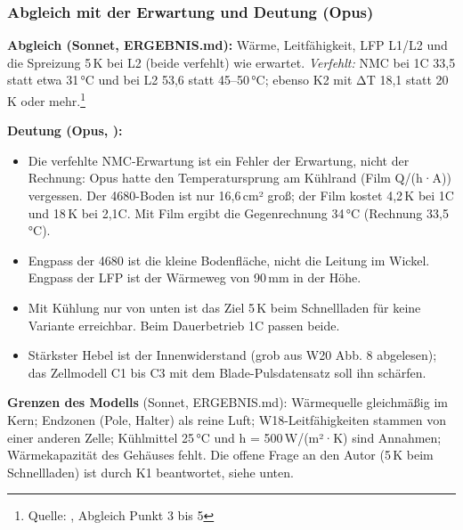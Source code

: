 \documentclass[10pt,a4paper]{article}
\newcommand{\quelle}[1]{\footnote{\raggedright Quelle: #1}}
\begin{document}
\subsubsection*{Abgleich mit der Erwartung und Deutung (Opus)}
\textbf{Abgleich (Sonnet, ERGEBNIS.md):} Wärme, Leitfähigkeit, LFP L1/L2 und die Spreizung 5\,K bei L2 (beide verfehlt) wie erwartet. \emph{Verfehlt:} NMC bei 1C 33,5 statt etwa 31\,°C und bei L2 53,6 statt 45--50\,°C; ebenso K2 mit ΔT 18,1 statt 20\,K oder mehr.\quelle{, Abgleich Punkt 3 bis 5}

\textbf{Deutung (Opus, ):}
\begin{itemize}[nosep]
\item Die verfehlte NMC-Erwartung ist ein Fehler der Erwartung, nicht der Rechnung: Opus hatte den Temperatursprung am Kühlrand (Film Q/(h·A)) vergessen. Der 4680-Boden ist nur 16,6\,cm² groß; der Film kostet 4,2\,K bei 1C und 18\,K bei 2,1C. Mit Film ergibt die Gegenrechnung 34\,°C (Rechnung 33,5\,°C).
\item Engpass der 4680 ist die kleine Bodenfläche, nicht die Leitung im Wickel. Engpass der LFP ist der Wärmeweg von 90\,mm in der Höhe.
\item Mit Kühlung nur von unten ist das Ziel 5\,K beim Schnellladen für keine Variante erreichbar. Beim Dauerbetrieb 1C passen beide.
\item Stärkster Hebel ist der Innenwiderstand (grob aus W20 Abb. 8 abgelesen); das Zellmodell C1 bis C3 mit dem Blade-Pulsdatensatz soll ihn schärfen.
\end{itemize}
\textbf{Grenzen des Modells} (Sonnet, ERGEBNIS.md): Wärmequelle gleichmäßig im Kern; Endzonen (Pole, Halter) als reine Luft; W18-Leitfähigkeiten stammen von einer anderen Zelle; Kühlmittel 25\,°C und h = 500\,W/(m²·K) sind Annahmen; Wärmekapazität des Gehäuses fehlt.
Die offene Frage an den Autor (5\,K beim Schnellladen) ist durch K1 beantwortet, siehe unten.
\end{document}
